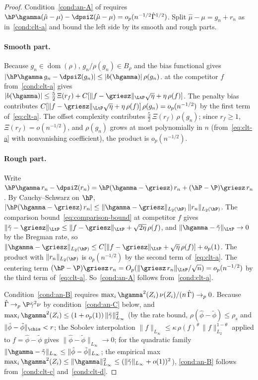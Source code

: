 \documentclass{article}
\begin{document}
\begin{proof}
Condition~\ref{cond:an-A} of
requires
$\hP\hgamma(\hat\mu - \mu)
  - \dpsiZ(\hat\mu - \mu)
  = o_p(n^{-1/2}\hat\Gamma^{1/2})$.
Split $\hat\mu - \mu = g_n + r_n$
as in~\ref{cond:clt-a}
and bound the left side
by its smooth and rough parts.

\paragraph{Smooth part.}
Because $g_n \in \operatorname{dom}(\rho)$,
$g_n/\rho(g_n) \in B_\rho$
and the bias functional gives
$|\hP\hgamma\,g_n - \dpsiZ(g_n)|
  \le |b(\hgamma)|\,\rho(g_n)$.
at the competitor $f$ from~\ref{cond:clt-a} gives
$|b(\hgamma)|
  \le \tfrac{5}{2}\,\Xi(r_f)
  + C[\|f - \griesz\|_{\LtP}\sqrt{\eta}
    + \eta\,\rho(f)]$.
The penalty bias contributes
$C[\|f-\griesz\|_{\LtP}\sqrt{\eta}
  + \eta\,\rho(f)]
  \,\rho(g_n)
  = o_p(n^{-1/2})$
by the first term of~\eqref{eq:clt-a}.
The offset complexity contributes
$\tfrac{5}{2}\,\Xi(r_f)\,\rho(g_n)$;
since $r_f \ge 1$,
$\Xi(r_f) = o(n^{-1/2})$,
and $\rho(g_n)$ grows at most polynomially
in $n$ (from~\eqref{eq:clt-a}
with nonvanishing coefficient),
the product is $o_p(n^{-1/2})$.

\paragraph{Rough part.}
Write
$\hP\hgamma\,r_n - \dpsiZ(r_n)
  = \hP(\hgamma - \griesz)\,r_n
  + (\hP - \P)\griesz\,r_n$.
By Cauchy--Schwarz on $\hP$,
$|\hP(\hgamma - \griesz)\,r_n|
  \le \|\hgamma - \griesz\|_{L_2(\hP)}\,
  \|r_n\|_{L_2(\hP)}$.
The comparison bound~\eqref{eq:comparison-bound}
at competitor $f$ gives
$\|\tilde\gamma - \griesz\|_{\LtP}
  \le \|f - \griesz\|_{\LtP}
  + \sqrt{2\eta}\,\rho(f)$,
and $\|\hgamma - \tilde\gamma\|_{\LtP} \to 0$
by the Bregman rate,
so
$\|\hgamma - \griesz\|_{L_2(\hP)}
  \le C[\|f - \griesz\|_{\LtP}
  + \sqrt{\eta}\,\rho(f)]
  + o_p(1)$.
The product with $\|r_n\|_{L_2(\hP)}$
is $o_p(n^{-1/2})$
by the second term of~\eqref{eq:clt-a}.
The centering term
$(\hP - \P)\griesz\,r_n
  = O_p(\|\griesz\,r_n\|_{\LtP}/\sqrt{n})
  = o_p(n^{-1/2})$
by the third term of~\eqref{eq:clt-a}.
So~\ref{cond:an-A} follows from~\ref{cond:clt-a}.

Condition~\ref{cond:an-B}
requires
$\max_i \hgamma^2(Z_i)\,\nu(Z_i)
  / (n\,\hat\Gamma) \to_p 0$.
Because $\hat\Gamma \to_p \P\tilde\gamma^2\nu$
by condition~\ref{cond:an-C} below,
and $\max_i \hgamma^2(Z_i)
  \le (1 + o_p(1))\,\|\tilde\gamma\|_{L_\infty}^2$
(by the rate bound,
$\rho(\hat\phi - \tilde\phi) \le \rho_s$
and $\|\hat\phi - \tilde\phi\|_{\chis} < r$;
the Sobolev interpolation
$\|f\|_{L_\infty}
  \le \kappa\,\rho(f)^\theta\,\|f\|_{L_2}^{1-\theta}$
applied to $f = \hat\phi - \tilde\phi$
gives $\|\hat\phi - \tilde\phi\|_{L_\infty} \to 0$;
for the quadratic family
$\|\hgamma - \tilde\gamma\|_{L_\infty}
  \le \|\hat\phi - \tilde\phi\|_{L_\infty}$;
the empirical max $\max_i \hgamma^2(Z_i)
  \le \|\hgamma\|_{L_\infty}^2
  \le (\|\tilde\gamma\|_{L_\infty} + o(1))^2$),
\ref{cond:an-B} follows from~\ref{cond:clt-c} and~\ref{cond:clt-d}.


\end{proof}
\end{document}

